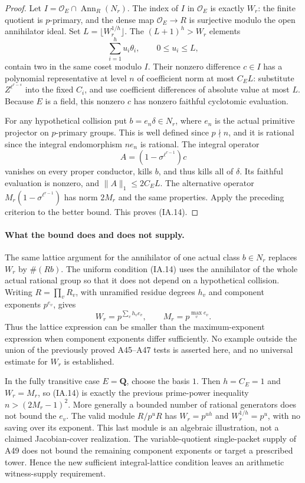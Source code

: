 \documentclass[11pt,a4paper]{article}
\begin{document}
\begin{proof}
Let $I=\mathcal O_E\cap\operatorname{Ann}_R(N_r)$. The index of $I$
in $\mathcal O_E$ is exactly $W_r$: the finite quotient is $p$-primary,
and the dense map $\mathcal O_E\to R$ is surjective modulo the open
annihilator ideal. Set $L=\lfloor W_r^{1/h}\rfloor$.
The $(L+1)^h>W_r$ elements
\[
                 \sum_{i=1}^h u_i\theta_i,\qquad 0\le u_i\le L,
\tag{IA.15}
\]
contain two in the same coset modulo $I$. Their nonzero difference
$c\in I$ has a polynomial representative at level $n$ of coefficient
norm at most $C_E L$: substitute $Z^{\ell^{r-s}}$ into the fixed
$C_i$, and use coefficient differences of absolute value at most $L$.
Because $E$ is a field, this nonzero $c$ has nonzero faithful
cyclotomic evaluation.

For any hypothetical collision put $b=e_n\delta\in N_r$, where
$e_n$ is the actual primitive projector on $p$-primary groups. This
is well defined since $p\nmid n$, and it is rational since the
integral endomorphism $ne_n$ is rational. The integral operator
\[
                  A=(1-\sigma^{\ell^{r-1}})c
\tag{IA.16}
\]
vanishes on every proper conductor, kills $b$, and thus kills all of
$\delta$. Its faithful evaluation is nonzero, and
$\|A\|_1\le2C_E L$. The alternative operator
$M_r(1-\sigma^{\ell^{r-1}})$ has norm $2M_r$ and the same properties.
Apply the preceding criterion to the better bound. This proves
(IA.14).
\end{proof}

\paragraph{What the bound does and does not supply.}
The same lattice argument for the annihilator of one actual class
$b\in N_r$ replaces $W_r$ by $\#(Rb)$. The uniform condition (IA.14)
uses the annihilator of the whole actual rational group so that it
does not depend on a hypothetical collision.
Writing $R=\prod_vR_v$, with unramified residue degrees $h_v$ and
component exponents $p^{e_v}$, gives
\[
                       W_r=p^{\sum_v h_ve_v},\qquad
                       M_r=p^{\max_v e_v}.
\tag{IA.17}
\]
Thus the lattice expression can be smaller than the maximum-exponent
expression when component exponents differ sufficiently. No example
outside the union of the previously proved A45--A47 tests is asserted
here, and no universal estimate for $W_r$ is established.

In the fully transitive case $E=\mathbf Q$, choose the basis $1$.
Then $h=C_E=1$ and $W_r=M_r$, so (IA.14) is exactly the previous
prime-power inequality $n>(2M_r-1)^2$. More generally a bounded
number of rational generators does not bound the $e_v$. The valid
module $R/p^uR$ has $W_r=p^{uh}$ and $W_r^{1/h}=p^u$, with no saving
over its exponent. This last module is an algebraic illustration,
not a claimed Jacobian-cover realization. The variable-quotient
single-packet supply of A49 does not bound the remaining component
exponents or target a prescribed tower. Hence the new sufficient
integral-lattice condition leaves an arithmetic witness-supply
requirement.
\end{document}
